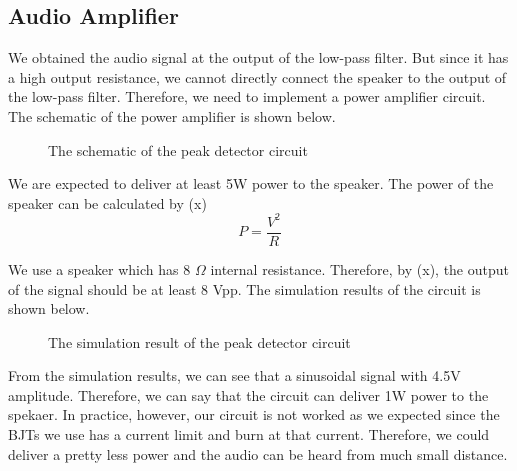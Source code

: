 \documentclass[conference]{IEEEtran}
\begin{document}
\subsection{Audio Amplifier}
\par We obtained the audio signal at the output of the low-pass filter. But since it has a high output resistance, we cannot directly connect 
the speaker to the output of the low-pass filter. Therefore, we need to implement a power amplifier circuit. The schematic of the power 
amplifier is shown below. 
\begin{figure}[H]
   \centerline{}
    \caption{The schematic of the peak detector circuit}
\end{figure}
\par We are expected to deliver at least 5W power to the speaker. The power of the speaker can be calculated by (x)
\begin{equation}
    P = \frac{V^2}{R}
\end{equation}
\par We use a speaker which has 8 \(\Omega\) internal resistance. Therefore, by (x), the output of the signal should be at least 8 Vpp. The 
simulation results of the circuit is shown below. 
\begin{figure}[H]
   \centerline{}
    \caption{The simulation result of the peak detector circuit}
\end{figure}
\par From the simulation results, we can see that a sinusoidal signal with 4.5V amplitude. Therefore, we can say that the circuit can deliver 
1W power to the spekaer. In practice, however, our circuit is not worked as we expected since the BJTs we use has a current limit and burn 
at that current. Therefore, we could deliver a pretty less power and the audio can be heard from much small distance. 
\end{document}
